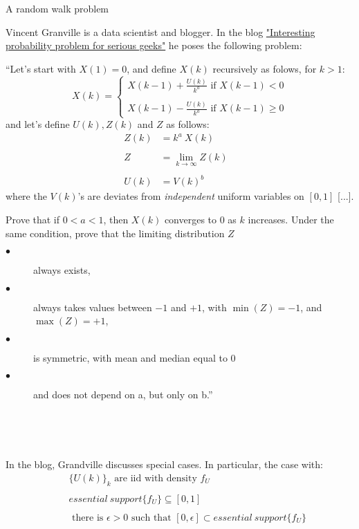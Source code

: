 \documentclass[12pt]{article}
\begin{document}
\begin{section}{A random walk problem}  
\label{sec:intro}
	
\hspace{20pt}Vincent Granville is a data scientist and blogger. In the blog \href{https://www.analyticbridge.datasciencecentral.com/profiles/blogs/interesting-probability-problem-for-serious-geeks/}{"Interesting probability problem for serious geeks"} he poses the following problem: 

 ``Let's start with $X(1)=0$, and define $X(k)$ recursively as folows, for $k>1$:
 $$
	X(k) = \begin{cases*}
		X(k-1) + \frac{U(k)}{k^a} \text{ if $X(k-1) < 0$} \\
		\\
		X(k-1) - \frac{U(k)}{k^a} \text{ if $X(k-1) \ge 0$} 
		\end{cases*} 
$$
and let's define $U(k), Z(k)$ and $Z$ as follows:
\begin{align*}
Z(k) &= k^a \ X(k) &\\
&\ &\\
Z &= \lim_{k \rightarrow \infty} Z(k) &\\
&\ &\\
U(k) &= V(k)^b &
\end{align*}
where the $V(k)$'s are deviates from \textit{independent} uniform variables on $[0,1]$ [...].  

Prove that if $0<a<1$, then $X(k)$ converges to $0$ as $k$ increases. Under the same condition, prove that the limiting distribution $Z$ 
\begin{description}
	\item[$\bullet$ ] always exists,
	\item[$\bullet$ ] always takes values between $-1$ and $+1$, with $\min(Z) = -1$, and $\max(Z) = +1$,
	\item[$\bullet$ ] is symmetric, with mean and median equal to 0
	\item[$\bullet$ ] and does not depend on a, but only on b.'' 
\end{description}  

\  

\  


In the blog, Grandville discusses special cases. In particular, the case with:
\begin{eqnarray} \label{fu_assm1}
&& \{U(k)\}_k \text{ are iid with density }f_U  \\ 
&& \nonumber \\
&& essential \ support \{ f_U \} \subseteq [0,1] \\
&& \nonumber \\
&& \label{ref:f_U} \text{ there is $\epsilon > 0$ such that }
[0, \epsilon] \subset essential \ support \{ f_U \} 
\end{eqnarray}  


\end{section}
\end{document}

